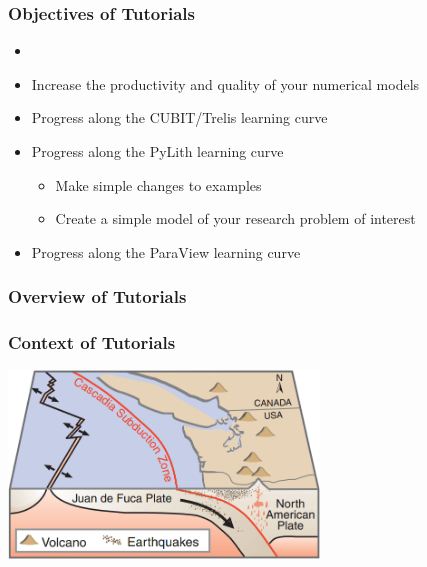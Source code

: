 \documentclass[aspectratio=169]{beamer}
\begin{document}
\begin{frame}
  \frametitle{Objectives of Tutorials}
  \summary{}
  
  \begin{itemize}
  \item {}
  \item Increase the productivity and quality of your numerical models
  \item Progress along the CUBIT/Trelis learning curve
  \item Progress along the PyLith learning curve
    \begin{itemize}
    \item Make simple changes to examples
    \item Create a simple model of your research problem of interest
    \end{itemize}
  \item Progress along the ParaView learning curve
  \end{itemize}

\end{frame}


\begin{frame}
  \frametitle{Overview of Tutorials}
  
  

\end{frame}


\begin{frame}
  \frametitle{Context of Tutorials}
  
  \begin{center}
    \includegraphics[height=5.0cm]{figs/subduction3d_cascadia}
  \end{center}

  \vfill
  
  
\end{frame}
\end{document}
